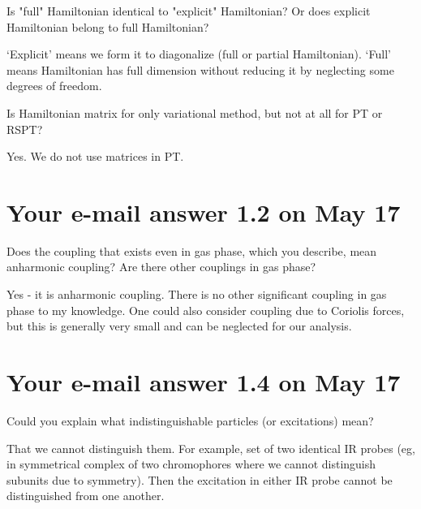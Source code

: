 \documentclass{exam}
\begin{document}
\begin{questions}
%
\question Is "full" Hamiltonian identical to "explicit" Hamiltonian? Or does explicit Hamiltonian belong to full Hamiltonian?

\begin{solution}
`Explicit' means we form it to diagonalize (full or partial Hamiltonian). 
`Full' means Hamiltonian has full dimension without reducing
it by neglecting some degrees of freedom.
\end{solution}

%
\question Is Hamiltonian matrix for only variational method, but not at all for PT or RSPT?

\begin{solution}
Yes. We do not use matrices in PT.
\end{solution}
\end{questions}

\section{Your e-mail answer 1.2 on May 17}
\begin{questions}

%
\question Does the coupling that exists even in gas phase, which you describe, mean anharmonic coupling? Are there other couplings in gas phase?

\begin{solution}
Yes - it is anharmonic coupling. There is no other significant coupling in gas phase to my knowledge.
One could also consider coupling due to Coriolis forces, but this is generally very small and can be
neglected for our analysis.
\end{solution}
\end{questions}

\section{Your e-mail answer 1.4 on May 17}
\begin{questions}

%
\question Could you explain what indistinguishable particles (or excitations) mean?

\begin{solution}
That we cannot distinguish them. For example, set of two identical IR probes
(eg, in symmetrical complex of two chromophores where we cannot distinguish
subunits due to symmetry). Then the excitation in either IR probe
cannot be distinguished from one another.
\end{solution}
\end{questions}
\end{document}
